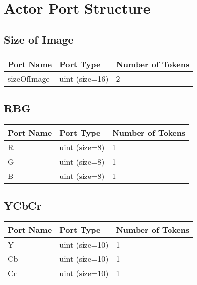 \newpage
\section{Actor Port Structure}

\subsection{Size of Image}
\begin{table}[!h]
\begin{tabular}{|l|l|l|}
\hline
\textbf{Port Name} & \textbf{Port Type} & \textbf{Number of Tokens} \\ \hline
sizeOfImage & uint (size=16) & 2 \\ \hline
\end{tabular}
\label{}
\end{table}


\subsection{RBG}
\begin{table}[!h]
\begin{tabular}{|l|l|l|}
\hline
\textbf{Port Name} & \textbf{Port Type} & \textbf{Number of Tokens} \\ \hline
R & uint (size=8) & 1 \\ \hline
G & uint (size=8) & 1 \\ \hline
B & uint (size=8) & 1 \\ \hline
\end{tabular}
\label{}
\end{table}

\subsection{YCbCr}
\begin{table}[!h]
\begin{tabular}{|l|l|l|}
\hline
\textbf{Port Name} & \textbf{Port Type} & \textbf{Number of Tokens} \\ \hline
Y & uint (size=10) & 1 \\ \hline
Cb & uint (size=10) & 1 \\ \hline
Cr & uint (size=10) & 1 \\ \hline
\end{tabular}
\label{}
\end{table}



